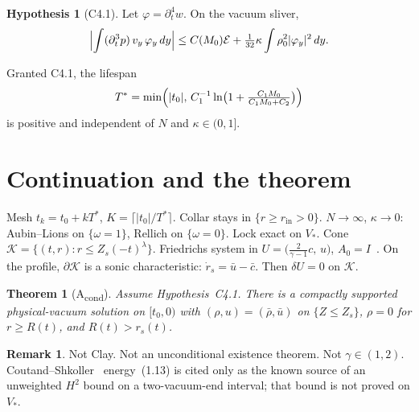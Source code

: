 \documentclass{amsart}
\theoremstyle{plain}
\newtheorem{theorem}{Theorem}
\theoremstyle{definition}
\newtheorem{hypothesis}{Hypothesis}
\newtheorem{remark}{Remark}
\begin{document}
\begin{hypothesis}[C4.1]
Let $\varphi=\partial_t^4 w$. On the vacuum sliver,
\[
\Bigl|\int(\partial_t^3 p)\,v_y\,\varphi_y\,dy\Bigr|
\le C(M_0)\mathcal{E}+\tfrac1{32}\kappa\int\rho_0^2|\varphi_y|^2\,dy.
\]
\end{hypothesis}

Granted C4.1, the lifespan
\[
T^*=\min\Bigl(|t_0|,\,
C_1^{-1}\ln\bigl(1+\tfrac{C_1 M_0}{C_1 M_0+C_2}\bigr)\Bigr)
\]
is positive and independent of $N$ and $\kappa\in(0,1]$.

\section{Continuation and the theorem}
Mesh $t_k=t_0+kT^*$, $K=\lceil|t_0|/T^*\rceil$.
Collar stays in $\{r\ge r_{\mathrm{in}}>0\}$.
$N\to\infty$, $\kappa\to0$: Aubin--Lions on $\{\omega=1\}$,
Rellich on $\{\omega=0\}$.
Lock exact on $V_*$.
Cone $\mathcal{K}=\{(t,r):r\le Z_s(-t)^\lambda\}$.
Friedrichs system in $U=\bigl(\tfrac{2}{\gamma-1}c,\,u\bigr)$, $A_0=I$~\cite{Kato1975}.
On the profile, $\partial\mathcal{K}$ is a sonic characteristic:
$\dot r_s=\bar u-\bar c$. Then $\delta U=0$ on $\mathcal{K}$.

\begin{theorem}[A\textsubscript{cond}]
Assume Hypothesis~C4.1. There is a compactly supported physical-vacuum
solution on $[t_0,0)$ with $(\rho,u)=(\bar\rho,\bar u)$ on $\{Z\le Z_s\}$,
$\rho=0$ for $r\ge R(t)$, and $R(t)>r_s(t)$.
\end{theorem}

\begin{remark}
Not Clay. Not an unconditional existence theorem. Not $\gamma\in(1,2)$.
Coutand--Shkoller~\cite{CS2011} energy~(1.13) is cited only as the known
source of an unweighted $H^2$ bound on a two-vacuum-end interval; that bound
is not proved on $V_*$.
\end{remark}



\end{document}
